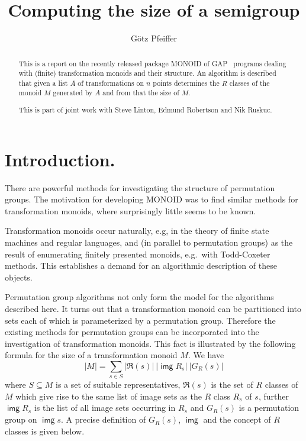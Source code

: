 \documentclass[12pt]{amsart}
\title{Computing the size of a semigroup}
\author{G\"otz Pfeiffer}
\newcommand{\img}{\mathop{\mathsf{img}}}
\newcommand{\R}{\mathfrak{R}}
\begin{document}
\begin{abstract}
  This  is a   report  on the  recently released  package  \textsf{MONOID} of
  \textsf{GAP}~\cite{Sch95}   programs  dealing with  (finite) transformation
  monoids and  their structure.  An algorithm is  described that given a list
  $A$ of transformations on   $n$ points determines   the $R$ classes  of the
  monoid $M$ generated by $A$ and from that the size of $M$.
  
  This is  part of  joint work  with Steve  Linton, Edmund Robertson  and Nik
  Ruskuc.
\end{abstract}

\maketitle

\section{Introduction.}
There are  powerful methods  for  investigating the structure  of permutation
groups.  The  motivation for developing \textsf{MONOID}   was to find similar
methods for  transformation  monoids, where  surprisingly  little seems to be
known.

Transformation monoids occur  naturally, e.g, in  the theory of  finite state
machines  and regular languages, and (in  parallel  to permutation groups) as
the result of enumerating finitely presented monoids, e.g.\ with Todd-Coxeter
methods.   This establishes a demand for  an algorithmic description of these
objects.

Permutation   group algorithms not  only form  the  model  for the algorithms
described here.  It turns out that a transformation monoid can be partitioned
into sets each of  which is parameterized by a  permutation group.  Therefore
the existing  methods  for permutation  groups can be   incorporated into the
investigation  of transformation monoids.   This  fact is illustrated by  the
following formula for the size of a transformation monoid $M$. We have
\begin{equation}  \label{eq:sum}
  |M| = \sum_{s\in S} |\R(s)|\ |\img R_s|\ |G_R(s)|
\end{equation}
where $S\subseteq M$ is a set of suitable representatives, $\R(s)$ is the set
of $R$ classes of $M$ which give rise  to the same list  of image sets as the
$R$ class $R_s$  of $s$, further  $\img R_s$  is the  list of  all image sets
occurring in  $R_s$ and  $G_R(s)$ is  a  permutation group  on  $\img  s$.  A
precise definition  of $G_R(s)$, $\img$   and the concept  of  $R$ classes is
given below.
\end{document}
